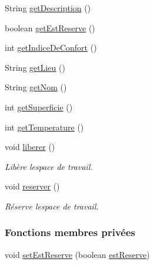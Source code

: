 \begin{DoxyCompactItemize}
\item 
String \hyperlink{classcom_1_1lasalle_1_1meeting_1_1_espace_de_travail_a815ecee3f01117f2d9b1d9441b214907}{get\+Description} ()
\item 
boolean \hyperlink{classcom_1_1lasalle_1_1meeting_1_1_espace_de_travail_a69fe30f8d3aff92986f4c39402e16ab0}{get\+Est\+Reserve} ()
\item 
int \hyperlink{classcom_1_1lasalle_1_1meeting_1_1_espace_de_travail_a9d7b3bd8aa78a10c70851b477d0f522d}{get\+Indice\+De\+Confort} ()
\item 
String \hyperlink{classcom_1_1lasalle_1_1meeting_1_1_espace_de_travail_af320aa4ad7711ed52b3b5aef1bd52dd1}{get\+Lieu} ()
\item 
String \hyperlink{classcom_1_1lasalle_1_1meeting_1_1_espace_de_travail_ae662e2674616a8548755cb64a38e0432}{get\+Nom} ()
\item 
int \hyperlink{classcom_1_1lasalle_1_1meeting_1_1_espace_de_travail_ae2c734da9d454b368ddb056b1cdae499}{get\+Superficie} ()
\item 
int \hyperlink{classcom_1_1lasalle_1_1meeting_1_1_espace_de_travail_a4c01c37fa6431d48c59274aaa00fdbe3}{get\+Temperature} ()
\item 
void \hyperlink{classcom_1_1lasalle_1_1meeting_1_1_espace_de_travail_affce017a0a5ba338d7b0b7f6bbce6c68}{liberer} ()
\begin{DoxyCompactList}\small\item\em Libère l\textquotesingle{}espace de travail. \end{DoxyCompactList}\item 
void \hyperlink{classcom_1_1lasalle_1_1meeting_1_1_espace_de_travail_a42d483a68e6d0d50707dbd3dddd164c2}{reserver} ()
\begin{DoxyCompactList}\small\item\em Réserve l\textquotesingle{}espace de travail. \end{DoxyCompactList}\end{DoxyCompactItemize}
\subsubsection*{Fonctions membres privées}
\begin{DoxyCompactItemize}
\item 
void \hyperlink{classcom_1_1lasalle_1_1meeting_1_1_espace_de_travail_ae6609cc6e5c42c0be7936ef3a3748bd0}{set\+Est\+Reserve} (boolean \hyperlink{classcom_1_1lasalle_1_1meeting_1_1_espace_de_travail_a8913c30ae6b72ae4f35962b1ecfc496b}{est\+Reserve})
\end{DoxyCompactItemize}
